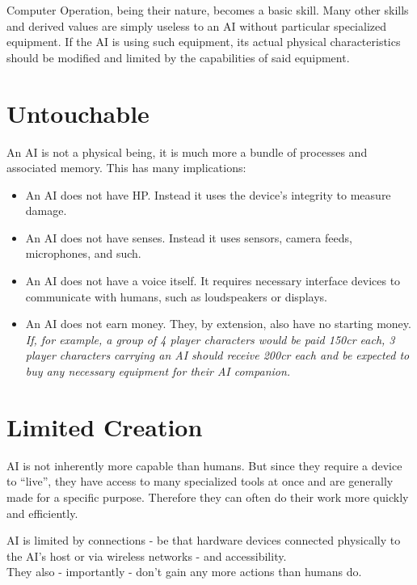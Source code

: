 \documentclass[12pt,a4paper,openany,usenames,dvipsnames]{book}
\begin{document}
	Computer Operation, being their nature, becomes a basic skill. Many other skills and derived values are simply useless to an AI without particular specialized equipment. If the AI is using such equipment, its actual physical characteristics should be modified and limited by the capabilities of said equipment.

	\chapter{Untouchable}
	An AI is not a physical being, it is much more a bundle of processes and associated memory. This has many implications:
	\vspace{-8mm}
	\begin{itemize}
		\setlength\itemsep{-8mm}
		\item An AI does not have HP. Instead it uses the device’s integrity to measure damage.
		\item An AI does not have senses. Instead it uses sensors, camera feeds, microphones, and such.
		\item An AI does not have a voice itself. It requires necessary interface devices to communicate with humans, such as loudspeakers or displays.
		\item An AI does not earn money.
			They, by extension, also have no starting money.\\
			\textit{If, for example, a group of 4 player characters would be paid 150cr each, 3 player characters carrying an AI should receive 200cr each and be expected to buy any necessary equipment for their AI companion.}
	\end{itemize}

	\chapter{Limited Creation}
	AI is not inherently more capable than humans.
	But since they require a device to “live”,
		they have access to many specialized tools at once
		and are generally made for a specific purpose.
	Therefore they can often do their work more quickly and efficiently.
	\par
	AI is limited by connections - be that hardware devices connected physically to the AI's host or via wireless networks - and accessibility.
	\\%
	They also - importantly - don’t gain any more actions than humans do.
\end{document}
